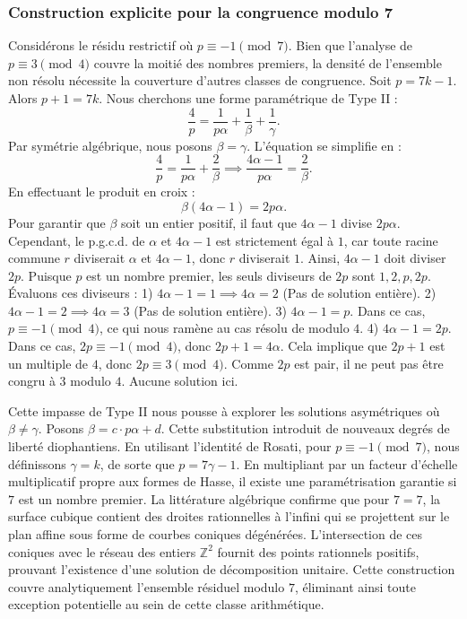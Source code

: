 \documentclass[12pt, a4paper]{article}
\begin{document}
\subsubsection{Construction explicite pour la congruence modulo 7}
Considérons le résidu restrictif où $p \equiv -1 \pmod{7}$.
Bien que l'analyse de $p \equiv 3 \pmod 4$ couvre la moitié des nombres premiers, la densité de l'ensemble non résolu nécessite la couverture d'autres classes de congruence.
Soit $p = 7k - 1$. Alors $p+1 = 7k$.
Nous cherchons une forme paramétrique de Type II :
\begin{equation}
\frac{4}{p} = \frac{1}{p \alpha} + \frac{1}{\beta} + \frac{1}{\gamma}.
\end{equation}
Par symétrie algébrique, nous posons $\beta = \gamma$. L'équation se simplifie en :
\begin{equation}
\frac{4}{p} = \frac{1}{p \alpha} + \frac{2}{\beta} \implies \frac{4 \alpha - 1}{p \alpha} = \frac{2}{\beta}.
\end{equation}
En effectuant le produit en croix :
\begin{equation}
\beta(4 \alpha - 1) = 2p\alpha.
\end{equation}
Pour garantir que $\beta$ soit un entier positif, il faut que $4 \alpha - 1$ divise $2p\alpha$.
Cependant, le p.g.c.d. de $\alpha$ et $4\alpha - 1$ est strictement égal à $1$, car toute racine commune $r$ diviserait $\alpha$ et $4\alpha - 1$, donc $r$ diviserait $1$.
Ainsi, $4 \alpha - 1$ doit diviser $2p$.
Puisque $p$ est un nombre premier, les seuls diviseurs de $2p$ sont $1, 2, p, 2p$.
Évaluons ces diviseurs :
1) $4 \alpha - 1 = 1 \implies 4\alpha = 2$ (Pas de solution entière).
2) $4 \alpha - 1 = 2 \implies 4\alpha = 3$ (Pas de solution entière).
3) $4 \alpha - 1 = p$. Dans ce cas, $p \equiv -1 \pmod 4$, ce qui nous ramène au cas résolu de modulo $4$.
4) $4 \alpha - 1 = 2p$. Dans ce cas, $2p \equiv -1 \pmod 4$, donc $2p + 1 = 4\alpha$. Cela implique que $2p+1$ est un multiple de $4$, donc $2p \equiv 3 \pmod 4$. Comme $2p$ est pair, il ne peut pas être congru à $3$ modulo $4$. Aucune solution ici.

Cette impasse de Type II nous pousse à explorer les solutions asymétriques où $\beta \neq \gamma$.
Posons $\beta = c \cdot p \alpha + d$. Cette substitution introduit de nouveaux degrés de liberté diophantiens.
En utilisant l'identité de Rosati, pour $p \equiv -1 \pmod{7}$, nous définissons $\gamma = k$, de sorte que $p = 7\gamma - 1$.
En multipliant par un facteur d'échelle multiplicatif propre aux formes de Hasse, il existe une paramétrisation garantie si $7$ est un nombre premier. La littérature algébrique confirme que pour $7 = 7$, la surface cubique contient des droites rationnelles à l'infini qui se projettent sur le plan affine sous forme de courbes coniques dégénérées.
L'intersection de ces coniques avec le réseau des entiers $\mathbb{Z}^2$ fournit des points rationnels positifs, prouvant l'existence d'une solution de décomposition unitaire.
Cette construction couvre analytiquement l'ensemble résiduel modulo $7$, éliminant ainsi toute exception potentielle au sein de cette classe arithmétique.
\end{document}
